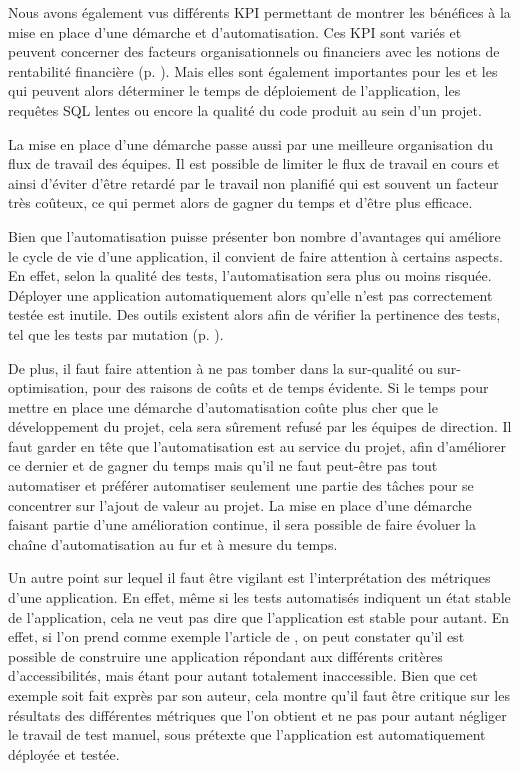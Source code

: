 Nous avons également vus différents \gls{KPI} permettant de montrer les bénéfices à la mise en place d'une démarche \devops{} et d'automatisation. Ces \gls{KPI} sont variés et peuvent concerner des facteurs organisationnels ou financiers avec les notions de rentabilité financière (p. \pageref{ref-rentabilite-finance}). Mais elles sont également importantes pour les \dev{} et les \ops{} qui peuvent alors déterminer le temps de déploiement de l'application, les requêtes \gls{SQL} lentes ou encore la qualité du code produit au sein d'un projet.

La mise en place d'une démarche \devops{} passe aussi par une meilleure organisation du flux de travail des équipes. Il est possible de limiter le flux de travail en cours et ainsi d'éviter d'être retardé par le travail non planifié qui est souvent un facteur très coûteux, ce qui permet alors de gagner du temps et d'être plus efficace.


Bien que l'automatisation puisse présenter bon nombre d'avantages qui améliore le cycle de vie d'une application, il convient de faire attention à certains aspects. En effet, selon la qualité des tests, l'automatisation sera plus ou moins risquée. Déployer une application automatiquement alors qu'elle n'est pas correctement testée est inutile. Des outils existent alors afin de vérifier la pertinence des tests, tel que les tests par mutation (p. \pageref{ref-mutation}). 

De plus, il faut faire attention à ne pas tomber dans la sur-qualité ou sur-optimisation, pour des raisons de coûts et de temps évidente. Si le temps pour mettre en place une démarche d'automatisation coûte plus cher que le développement du projet, cela sera sûrement refusé par les équipes de direction. Il faut garder en tête que l'automatisation est au service du projet, afin d'améliorer ce dernier et de gagner du temps mais qu'il ne faut peut-être pas tout automatiser et préférer automatiser seulement une partie des tâches pour se concentrer sur l'ajout de valeur au projet. La mise en place d'une démarche \devops{} faisant partie d'une amélioration continue, il sera possible de faire évoluer la chaîne d'automatisation au fur et à mesure du temps.

Un autre point sur lequel il faut être vigilant est l'interprétation des métriques d'une application. En effet, même si les tests automatisés indiquent un état stable de l'application, cela ne veut pas dire que l'application est stable pour autant. En effet, si l'on prend comme exemple l'article   de \citeauthor{web_inaccessible_app} \cite{web_inaccessible_app}, on peut constater qu'il est possible de construire une application répondant aux différents critères d'accessibilités, mais étant pour autant totalement inaccessible. Bien que cet exemple soit fait exprès par son auteur, cela montre qu'il faut être critique sur les résultats des différentes métriques que l'on obtient et ne pas pour autant négliger le travail de test manuel, sous prétexte que l'application est automatiquement déployée et testée.

